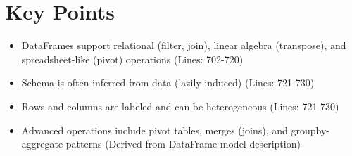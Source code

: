 \documentclass{article}
\begin{document}
\section*{Key Points}
\begin{itemize}
    \item DataFrames support relational (filter, join), linear algebra (transpose), and spreadsheet-like (pivot) operations (Lines: 702-720)
    \item Schema is often inferred from data (lazily-induced) (Lines: 721-730)
    \item Rows and columns are labeled and can be heterogeneous (Lines: 721-730)
    \item Advanced operations include pivot tables, merges (joins), and groupby-aggregate patterns (Derived from DataFrame model description)
\end{itemize}
\end{document}
